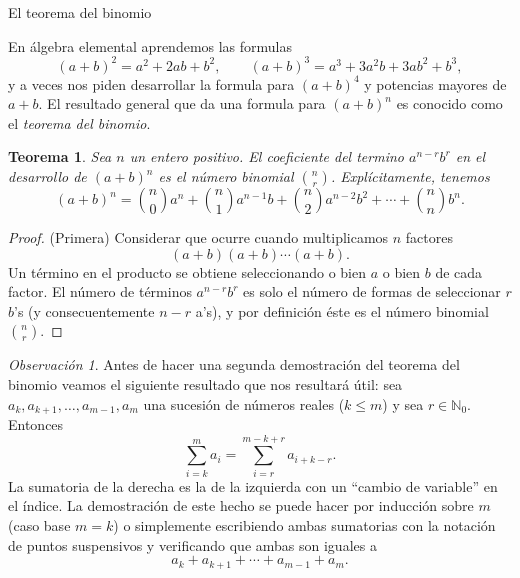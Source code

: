 \documentclass[11pt,spanish,makeidx]{amsbook}
\newtheorem{teorema}{Teorema}[section]
\theoremstyle{definition}
\theoremstyle{remark}
\newtheorem{observacion}{Observaci\'on}[section]
\begin{document}
\begin{section}{El teorema del binomio}

En álgebra elemental aprendemos las formulas
$$
(a+b)^2 = a^2 +2ab +b^2, \qquad (a+b)^3 = a^3 + 3 a^2b +3ab^2 +
b^3,
$$
y a veces nos piden desarrollar la formula para $(a+b)^4$ y potencias mayores de $a+b$. El resultado general que da una formula para $(a+b)^n$ es conocido como el  {\it {teorema del binomio}}.  

\begin{teorema}\label{t3.6} Sea $n$ un entero positivo. El coeficiente del termino $a^{n-r}b^r$ en el desarrollo de $(a+b)^n$ es el número binomial $\binom{n}{r}$. Explícitamente, tenemos
$$
(a+b)^n= \binom{n}{0} a^n + \binom{n}{1} a^{n-1}b+ \binom{n}{2}
a^{n-2}b^2 + \cdots + \binom{n}{n} b^n.
$$
\end{teorema}
\begin{proof}(Primera) Considerar que ocurre cuando multiplicamos $n$ factores
$$
(a+b)(a+b) \cdots (a+b).
$$
Un término en el producto se obtiene seleccionando o bien $a$ o bien $ b$ de cada factor. El número de términos $a^{n-r}b^r$ es solo el número de formas de seleccionar $r$ $b$'s (y consecuentemente $n-r$ a's), y por definición éste es el número binomial $\binom{n}{r}$.
\end{proof}

\begin{observacion}\label{cvar} Antes de hacer una segunda demostración del teorema del binomio veamos el siguiente resultado que nos resultará útil: sea $a_k,a_{k+1},\ldots,a_{m-1},a_m$ una sucesión de números reales ($k \le m$) y sea $r \in \mathbb N_0$.  Entonces
$$
\sum_{i=k}^m a_i = \sum_{i=r}^{m-k+r} a_{i+k-r}.
$$ 
La sumatoria de la derecha es la de la izquierda con un ``cambio de variable'' en el índice. La demostración de este hecho se puede hacer por inducción sobre $m$ (caso base $m=k$) o simplemente escribiendo ambas sumatorias con la notación de puntos suspensivos y verificando que ambas son iguales a
$$
a_k+a_{k+1}+\cdots+a_{m-1}+a_m.
$$  
\end{observacion}


\end{section}
\end{document}
